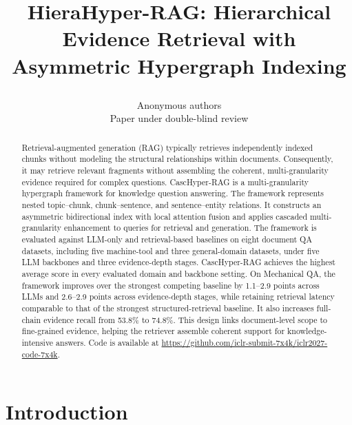 \documentclass{article} %
\title{\raggedright HieraHyper-RAG: Hierarchical Evidence Retrieval with Asymmetric Hypergraph Indexing}
\author{Anonymous authors\\
Paper under double-blind review}
\begin{document}
\makeatletter
\let\paper@originaltextbottom\@textbottom
\def\@textbottom{%
  \ifnum\value{page}=\getpagerefnumber{fig:mechanical_llm_overall}\relax
    \vskip\z@ plus .0001fil
  \else
    \paper@originaltextbottom
  \fi}
\makeatother


\maketitle

\begin{abstract}
Retrieval-augmented generation (RAG) typically retrieves independently indexed chunks without modeling the structural relationships within documents. Consequently, it may retrieve relevant fragments without assembling the coherent, multi-granularity evidence required for complex questions. CascHyper-RAG is a multi-granularity hypergraph framework for knowledge question answering. The framework represents nested topic--chunk, chunk--sentence, and sentence--entity relations. It constructs an asymmetric bidirectional index with local attention fusion and applies cascaded multi-granularity enhancement to queries for retrieval and generation. The framework is evaluated against LLM-only and retrieval-based baselines on eight document QA datasets, including five machine-tool and three general-domain datasets, under five LLM backbones and three evidence-depth stages. CascHyper-RAG achieves the highest average score in every evaluated domain and backbone setting. On Mechanical QA, the framework improves over the strongest competing baseline by 1.1--2.9 points across LLMs and 2.6--2.9 points across evidence-depth stages, while retaining retrieval latency comparable to that of the strongest structured-retrieval baseline. It also increases full-chain evidence recall from 53.8\% to 74.8\%. This design links document-level scope to fine-grained evidence, helping the retriever assemble coherent support for knowledge-intensive answers. Code is available at \url{https://github.com/iclr-submit-7x4k/iclr2027-code-7x4k}.
\end{abstract}

\section{Introduction}
\end{document}
